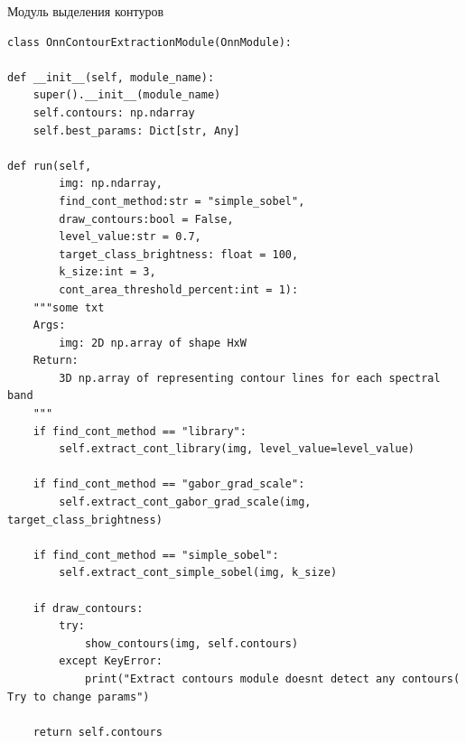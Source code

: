 \documentclass[14pt, russian]{scrartcl}
\begin{document}
\begin{listing}[H]
    \caption{Модуль выделения контуров}
    \label{lst:contour_extr}
    \begin{verbatim}
class OnnContourExtractionModule(OnnModule):

def __init__(self, module_name):
    super().__init__(module_name)
    self.contours: np.ndarray
    self.best_params: Dict[str, Any]

def run(self, 
        img: np.ndarray, 
        find_cont_method:str = "simple_sobel", 
        draw_contours:bool = False,
        level_value:str = 0.7,
        target_class_brightness: float = 100,
        k_size:int = 3,
        cont_area_threshold_percent:int = 1):
    """some txt
    Args:
        img: 2D np.array of shape HxW
    Return:
        3D np.array of representing contour lines for each spectral band
    """
    if find_cont_method == "library":
        self.extract_cont_library(img, level_value=level_value)

    if find_cont_method == "gabor_grad_scale":
        self.extract_cont_gabor_grad_scale(img, target_class_brightness)

    if find_cont_method == "simple_sobel":
        self.extract_cont_simple_sobel(img, k_size)

    if draw_contours:
        try:
            show_contours(img, self.contours)
        except KeyError:
            print("Extract contours module doesnt detect any contours( Try to change params")

    return self.contours
    \end{verbatim}
\end{listing}
\end{document}

